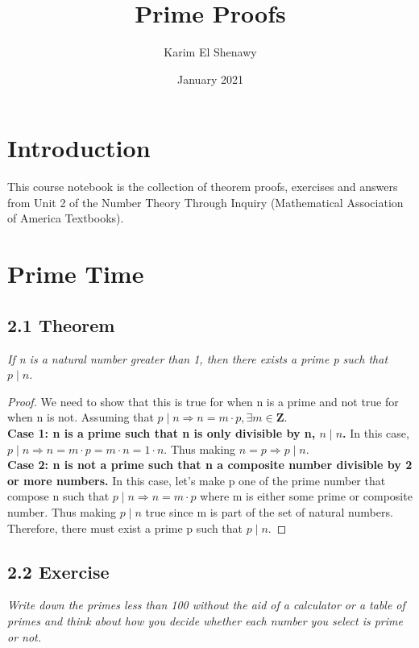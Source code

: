 \documentclass{article}
\title{Prime Proofs}
\author{Karim El Shenawy}
\date{January 2021}
\begin{document}
\maketitle

\section*{Introduction}
This course notebook is the collection of theorem proofs, exercises and answers from Unit 2 of the Number Theory Through Inquiry (Mathematical Association of America Textbooks).

\section*{Prime Time}

\subsection*{2.1 Theorem} 
\quad \textit{If n is a natural number greater than 1, then there exists a prime p such that $p \mid n$.}

\begin{proof}
We need to show that this is true for when n is a prime and not true for when n is not. Assuming that $p \mid n \Longrightarrow  n = m \cdot p, \exists m \in \mathbf{Z}$.\\
\textbf{Case 1: n is a prime such that n is only divisible by n, $n \mid n$.} In this case, $p \mid n \Longrightarrow n = m \cdot p = m \cdot n = 1 \cdot n$. Thus making $n = p \Longrightarrow p \mid n$.\\
\textbf{Case 2: n is not a prime such that n a composite number divisible by 2 or more numbers.} In this case, let's make p one of the prime number that compose n such that $p \mid n \Longrightarrow n = m \cdot p$ where m is either some prime or composite number. Thus making  $p \mid n$ true since m is part of the set of natural numbers.\\
Therefore, there must exist a prime p such that $p \mid n$.
\end{proof}

\subsection*{2.2 Exercise} 
\quad \textit{Write down the primes less than 100 without the aid of a calculator or a table of primes and think about how you decide whether each number you select is prime or not.}
\end{document}
